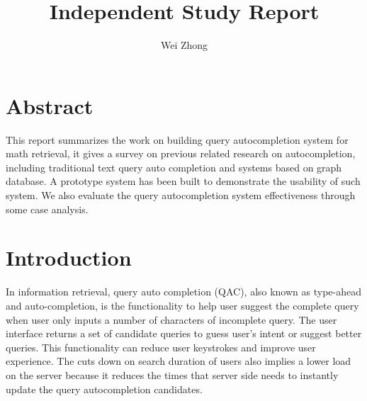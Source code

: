 \documentclass[12pt]{article} %
\begin{document}
\title{Independent Study Report}
\author{Wei Zhong}
\date{}

\maketitle

\section{Abstract}
This report summarizes the work on building query autocompletion system for math retrieval, it gives a survey on previous related research on autocompletion, including traditional text query auto completion and systems based on graph database. A prototype system has been built to demonstrate the usability of such system. We also evaluate the query autocompletion system effectiveness through some case analysis.

\section{Introduction}
In information retrieval, query auto completion (QAC), also known as type-ahead and auto-completion, is the functionality to help user suggest the complete query when user only inputs a number of characters of incomplete query.
The user interface returns a set of candidate queries 
to guess user's intent or suggest better queries.
This functionality can reduce user keystrokes and improve user experience.
The cuts down on search duration of users also implies a lower load on the server because it reduces the times that server side needs to instantly update the query autocompletion candidates.
\end{document}
